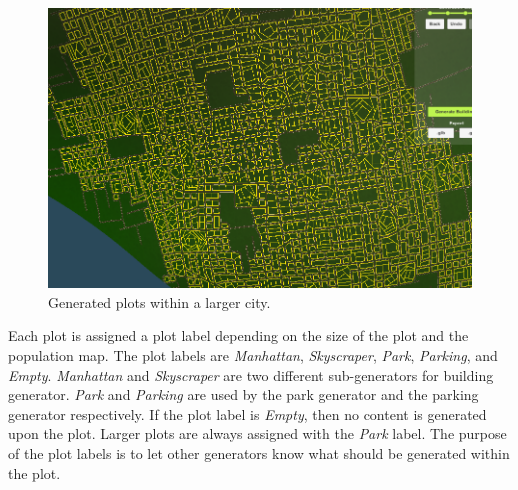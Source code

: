\begin{figure}[H]
\begin{minipage}[b][][b]{.50\textwidth}
\begin{minipage}[b][][b]{.9\textwidth}
      \includegraphics[width=\textwidth]{figure/plot.png}
      \caption{Generated plots within a larger city.}
      \label{fig:plot}
    \end{minipage}
  \end{minipage}
\end{figure}

Each plot is assigned a plot label depending on the size of the plot and the population map.
The plot labels are \textit{Manhattan}, \textit{Skyscraper}, \textit{Park}, \textit{Parking}, and \textit{Empty}.
\textit{Manhattan} and \textit{Skyscraper} are two different sub-generators for building generator. 
\textit{Park} and \textit{Parking} are used by the park generator and the parking generator respectively.
If the plot label is \textit{Empty}, then no content is generated upon the plot.
Larger plots are always assigned with the \textit{Park} label.
The purpose of the plot labels is to let other generators know what should be generated within the plot.
